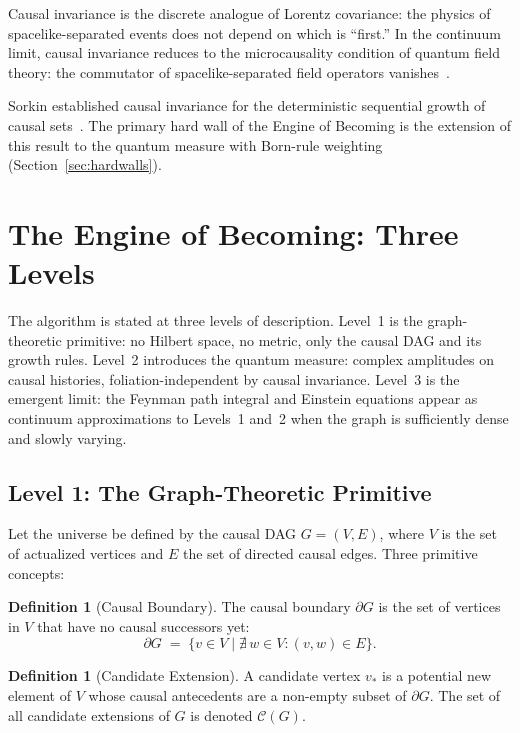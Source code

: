 \documentclass[11pt,a4paper]{article}
\theoremstyle{plain}
\theoremstyle{definition}
\newtheorem{definition}[theorem]{Definition}
\theoremstyle{remark}
\begin{document}
Causal invariance is the discrete analogue of Lorentz covariance: the physics
of spacelike-separated events does not depend on which is ``first.'' In the
continuum limit, causal invariance reduces to the microcausality condition of
quantum field theory: the commutator of spacelike-separated field operators
vanishes~\citep{Haag1996}.

Sorkin established causal invariance for the deterministic sequential growth
of causal sets~\citep{RideoutSorkin2000}. The primary hard wall of the Engine
of Becoming is the extension of this result to the quantum measure with
Born-rule weighting (Section~\ref{sec:hardwalls}).

\section{The Engine of Becoming: Three Levels}
\label{sec:algorithm}

The algorithm is stated at three levels of description. Level~1 is the
graph-theoretic primitive: no Hilbert space, no metric, only the causal DAG
and its growth rules. Level~2 introduces the quantum measure: complex amplitudes
on causal histories, foliation-independent by causal invariance. Level~3 is
the emergent limit: the Feynman path integral and Einstein equations appear
as continuum approximations to Levels~1 and~2 when the graph is sufficiently
dense and slowly varying.

\subsection{Level 1: The Graph-Theoretic Primitive}

Let the universe be defined by the causal DAG $G = (V, E)$, where $V$ is the
set of actualized vertices and $E$ the set of directed causal edges. Three
primitive concepts:

\begin{definition}[Causal Boundary]
The causal boundary $\partial G$ is the set of vertices in $V$ that have no
causal successors yet:
\begin{equation}
  \partial G \;=\; \{v \in V \mid \nexists\, w \in V : (v,w) \in E\}.
  \label{eq:boundary_v2}
\end{equation}
\end{definition}

\begin{definition}[Candidate Extension]
A candidate vertex $v_*$ is a potential new element of $V$ whose causal
antecedents are a non-empty subset of $\partial G$. The set of all candidate
extensions of $G$ is denoted $\mathcal{C}(G)$.
\end{definition}
\end{document}
